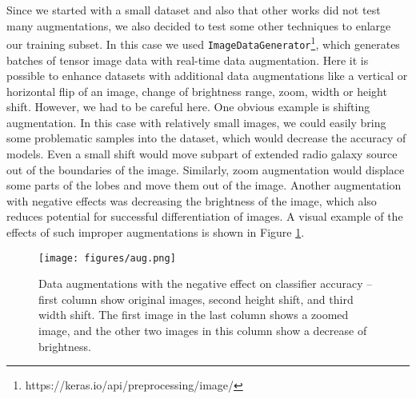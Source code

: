 \documentclass[fleqn,usenatbib]{mnras}
\begin{document}
Since we started with a small dataset and also that other works \citep{1, 2, 3, Lukic_2018} did not test many augmentations, we also decided to test some other techniques to enlarge our training subset. In this case we used \texttt{ImageDataGenerator}\footnote{https://keras.io/api/preprocessing/image/}, which generates batches of tensor image data with real-time data augmentation. Here it is possible to enhance datasets with additional data augmentations like a vertical or horizontal flip of an image, change of brightness range, zoom, width or height shift. However, we had to be careful here. One obvious example is shifting augmentation. In this case with relatively small images, we could easily bring some problematic samples into the dataset, which would decrease the accuracy of models. Even a small shift would move subpart of extended radio galaxy source out of the boundaries of the image. Similarly, zoom augmentation would displace some parts of the lobes and move them out of the image. Another augmentation with negative effects was decreasing the brightness of the image, which also reduces potential for successful differentiation of images. A visual example of the effects of such improper augmentations is shown in Figure \ref{fig:augmentation}.    

\begin{figure}
    \centering
    \texttt{[image: figures/aug.png]}
    \caption{Data augmentations with the negative effect on classifier accuracy -- first column show original images, second height shift, and third width shift. The first image in the last column shows a zoomed image, and the other two images in this column show a decrease of brightness.}
    \label{fig:augmentation}
\end{figure}
\end{document}
